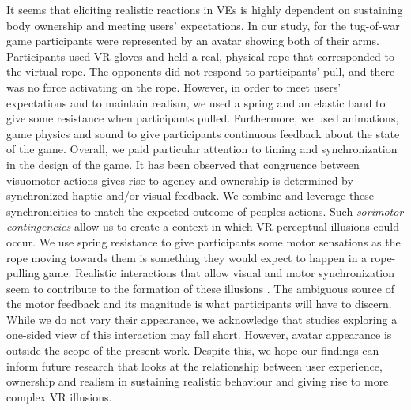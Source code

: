 It seems that eliciting realistic reactions in VEs is highly dependent on sustaining body ownership and meeting users' expectations. In our study, for the tug-of-war game participants were represented by an avatar showing both of their arms. Participants used VR gloves and held a real, physical rope that corresponded to the virtual rope. The opponents did not respond to participants' pull, and there was no force activating on the rope. However, in order to meet users' expectations and to maintain realism, we used a spring and an elastic band to give some resistance when participants pulled. Furthermore, we used animations, game physics and sound to give participants continuous feedback about the state of the game. Overall, we paid particular attention to timing and synchronization in the design of the game. It has been observed that congruence between visuomotor actions gives rise to agency  \cite{kilteni2012sense} and ownership is determined by synchronized haptic and/or visual feedback. We combine and leverage these synchronicities to match the expected outcome of peoples actions. Such \textit{sorimotor contingencies} \cite{slater2009place} allow us to create a context in which VR perceptual illusions could occur. We use spring resistance to give participants some motor sensations as the rope moving towards them is something they would expect to happen in a rope-pulling game. Realistic interactions that allow visual and motor synchronization seem to contribute to the formation of these illusions \cite{slater2009place}. The ambiguous source of the motor feedback and its magnitude is what participants will have to discern. While we do not vary their appearance, we acknowledge that studies exploring a one-sided view of this interaction may fall short. However, avatar appearance is outside the scope of the present work. Despite this, we hope our findings can inform future research that looks at the relationship between user experience, ownership and realism in sustaining realistic behaviour and giving rise to more complex VR illusions.
